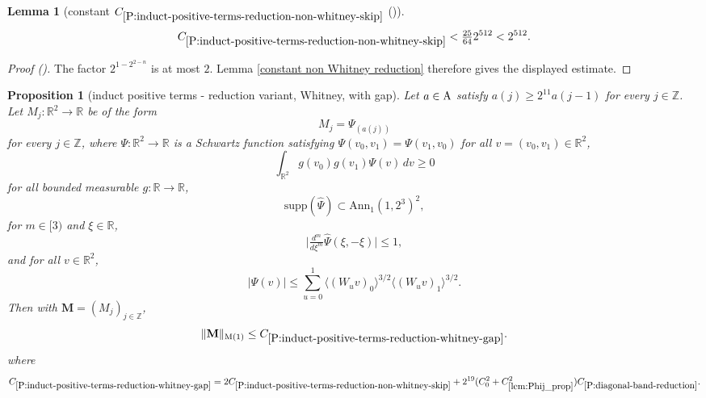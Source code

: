 \documentclass[12pt,reqno]{amsart}
\newcommand{\auto}{{({\tiny\faCar})}}
\theoremstyle{plain}
\newtheorem{lemma}[theorem]{Lemma}
\newtheorem{proposition}[theorem]{Proposition}
\numberwithin{equation}{section}
\theoremstyle{remark}
\newcommand{\using}[1]{}
\newcommand{\Z}{{\mathbb Z}}
\newcommand{\R}{{\mathbb R}}
\newcommand{\M}{\mathbf{M}}
\begin{document}
\begin{lemma}[constant $C_{\ref{P:induct-positive-terms-reduction-non-whitney-skip}}$ \auto]\label{constant non Whitney skip reduction}\using{constant non Whitney reduction}\using{P:induct-positive-terms-reduction-non-whitney-skip}
\begin{equation}\label{constant non Whitney skip reduction bound}
C_{\ref{P:induct-positive-terms-reduction-non-whitney-skip}}
<\tfrac{25}{64}2^{512}<2^{512}.
\end{equation}
\end{lemma}
\begin{proof}[Proof \auto]
The factor $2^{1-2^{2-n}}$ is at most $2$. Lemma \ref{constant non Whitney reduction} therefore gives the displayed estimate.
\end{proof}


\begin{proposition}[induct positive terms - reduction variant, Whitney, with gap]
\label{P:induct-positive-terms-reduction-whitney-gap}\using{lem:Phij_prop}\using{lem:form_pos}\using{P:induct-positive-terms-reduction-non-whitney-skip}\using{P:vanishing-diagonal-reduction}\using{lem:smoothdecay2}\using{lem:scaleest}\using{P:diagonal-band-reduction}
Let $a\in {\rm A}$ satisfy $a(j)\geq 2^{11}a(j-1)$ for every $j\in\mathbb Z$. Let $M_j:\mathbb{R}^2\to \mathbb{R}$ be of the form
\begin{equation}\label{auto:Whitney-gap-kernel}
M_j=\Psi_{(a(j))}
\end{equation}
for every $j\in\Z$, where $\Psi:\mathbb{R}^2\to \mathbb{R}$ is a Schwartz function satisfying $\Psi(v_0,v_1)=\Psi(v_1,v_0)$ for all $v=(v_0,v_1)\in\mathbb{R}^2$,
\begin{equation}\label{p1-on-W_pos}
\int_{\mathbb{R}^2} g(v_0){g(v_1)}\Psi(v)\,dv\ge 0
\end{equation}
for all bounded measurable $g:\mathbb{R}\to\mathbb{R}$,
\begin{equation}\label{p1-on-W_supp}
\mathrm{supp}(\widehat{\Psi}) \subset \mathrm{Ann}_1(1, 2^3)^2,
\end{equation}
for $m\in [3)$ and $\xi \in \R$,
\begin{equation}\label{p1-on-W_der}
\Big|\tfrac{d^m}{d\xi^{m}} \widehat{\Psi}(\xi,-\xi)\Big| \leq 1,
\end{equation}
and for all $v\in\mathbb{R}^2$,
\begin{equation}\label{p1-on-W_decay}
|\Psi(v)| \le \sum_{u=0}^1 \langle(W_u v)_0\rangle^{3/2} \langle (W_u v)_1\rangle^{3/2}.
\end{equation}
Then with $\M=(M_j)_{j\in\Z}$,
\begin{equation}\label{auto:Whitney-gap-reduction-bound}
\|\M\|_{\rm M(1)} \le C_{\ref{P:induct-positive-terms-reduction-whitney-gap}}.
\end{equation}
where
\begin{equation}\label{auto:Whitney-gap-constant-definition}
C_{\ref{P:induct-positive-terms-reduction-whitney-gap}}
=2C_{\ref{P:induct-positive-terms-reduction-non-whitney-skip}}
+2^{19}(C_0^2+C_{\ref{lem:Phij_prop}}^2)C_{\ref{P:diagonal-band-reduction}}.
\end{equation}
\end{proposition}
\end{document}
